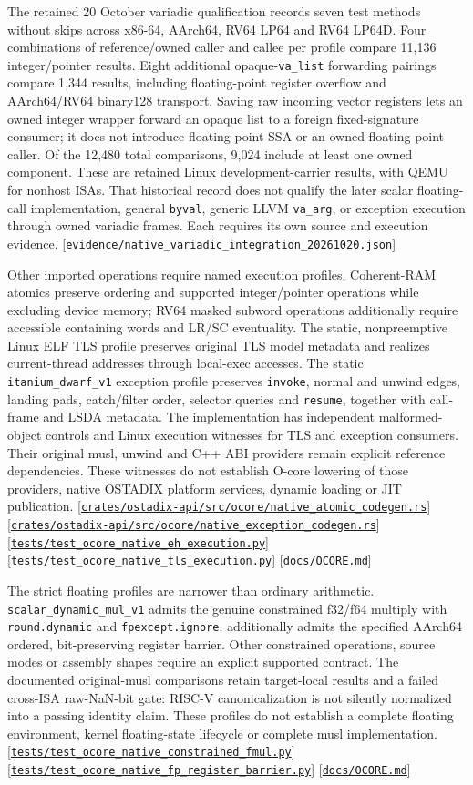 \documentclass[11pt,oneside]{article}
\newcommand{\src}[1]{\textcolor{OSlate}{\scriptsize[\href{https://github.com/lostadi/OSTADIX/blob/c0b02c326b2329a95ba52447c7180bc93957cd57/#1}{\nolinkurl{#1}}]}\allowbreak}
\newcommand{\breakcode}[1]{\texttt{\seqsplit{#1}}}
\begin{document}
The retained 20 October variadic qualification records seven test methods
without skips across x86-64, AArch64, RV64 LP64 and RV64 LP64D. Four combinations
of reference/owned caller and callee per profile compare 11,136 integer/pointer
results. Eight additional opaque-\texttt{va\_list} forwarding pairings compare
1,344 results, including floating-point register overflow and AArch64/RV64
binary128 transport. Saving raw incoming vector registers lets an owned
integer wrapper forward an opaque list to a foreign fixed-signature consumer;
it does not introduce floating-point SSA or an owned floating-point caller.
Of the 12,480 total comparisons, 9,024 include at least one owned component.
These are retained Linux development-carrier results, with QEMU for nonhost
ISAs. That historical record does not qualify the later scalar floating-call
implementation, general \texttt{byval}, generic LLVM \texttt{va\_arg}, or
exception execution through owned variadic frames. Each requires its own
source and execution evidence.
\src{evidence/native_variadic_integration_20261020.json}

Other imported operations require named execution profiles. Coherent-RAM
atomics preserve ordering and supported integer/pointer operations while
excluding device memory; RV64 masked subword operations additionally require
accessible containing words and LR/SC eventuality. The static, nonpreemptive
Linux ELF TLS profile preserves original TLS model metadata and realizes
current-thread addresses through local-exec accesses. The static
\texttt{itanium\_dwarf\_v1} exception profile preserves \texttt{invoke}, normal
and unwind edges, landing pads, catch/filter order, selector queries and
\texttt{resume}, together with call-frame and LSDA metadata. The implementation
has independent malformed-object controls and Linux execution witnesses for
TLS and exception consumers. Their original musl, unwind and C++ ABI providers
remain explicit reference dependencies. These witnesses do not establish
O-core lowering of those providers, native OSTADIX platform services, dynamic
loading or JIT publication.
\src{crates/ostadix-api/src/ocore/native_atomic_codegen.rs}
\src{crates/ostadix-api/src/ocore/native_exception_codegen.rs}
\src{tests/test_ocore_native_eh_execution.py}
\src{tests/test_ocore_native_tls_execution.py}
\src{docs/OCORE.md}

The strict floating profiles are narrower than ordinary arithmetic.
\texttt{scalar\_dynamic\_mul\_v1} admits the genuine constrained f32/f64
multiply with \texttt{round.dynamic} and \texttt{fpexcept.ignore}.
\breakcode{scalar\_dynamic\_mul\_register\_barrier\_v1} additionally admits the
specified AArch64 ordered, bit-preserving register barrier. Other constrained
operations, source modes or assembly shapes require an explicit supported
contract. The documented original-musl comparisons retain target-local
results and a failed cross-ISA raw-NaN-bit gate: RISC-V canonicalization is
not silently normalized into a passing identity claim. These profiles do not
establish a complete floating environment, kernel floating-state lifecycle
or complete musl implementation.
\src{tests/test_ocore_native_constrained_fmul.py}
\src{tests/test_ocore_native_fp_register_barrier.py}
\src{docs/OCORE.md}
\end{document}

